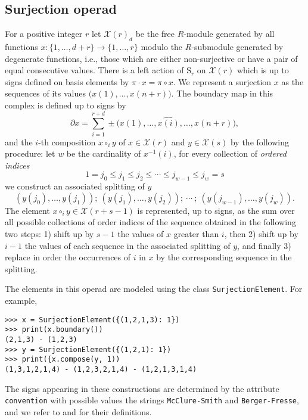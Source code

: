 \documentclass{amsart}
\newcommand{\X}{\mathcal X}
\begin{document}
\subsection{Surjection operad}

For a positive integer $r$ let $\mathcal X(r)_d$ be the free $R$-module generated by all functions $x : \{1, \dots, d+r\} \to \{1, \dots, r\}$ modulo the $R$-submodule generated by degenerate functions, i.e., those which are either non-surjective or have a pair of equal consecutive values. There is a left action of $\mathrm S_r$ on $\mathcal X(r)$ which is up to signs defined on basis elements by $\pi \cdot x = \pi \circ x$.
We represent a surjection $x$ as the sequences of its values $\big( x(1), \dots, x(n+r) \big)$. The boundary map in this complex is defined up to signs by
\begin{equation*}
\partial x = \sum_{i = 1}^{r+d} \pm \big( x(1), \dots, \widehat{x(i)}, \dots, x(n+r) \big),
\end{equation*}
and the $i$-th composition $x \circ_i y$ of $x \in \mathcal X(r)$ and $y \in \mathcal X(s)$ by the following procedure: let $w$ be the cardinality of $x^{-1}(i)$, for every collection of \textit{ordered indices}
\begin{equation*}
1 = j_0 \leq j_1 \leq j_2 \leq \cdots \leq j_{w-1} \leq j_w = s
\end{equation*}
we construct an associated splitting of $y$
\begin{equation*}
(y(j_0), \dots, y(j_1));\ (y(j_1), \dots, y(j_2));\ \cdots \ ;\ (y(j_{w-1}), \dots, y(j_w)).
\end{equation*}
The element $x \circ_i y \in \X(r+s-1)$ is represented, up to signs, as the sum over all possible collections of order indices of the sequence obtained in the following two steps: 1) shift up by $s-1$ the values of $x$ greater than $i$, then 2) shift up by $i-1$ the values of each sequence in the associated splitting of $y$, and finally 3) replace in order the occurrences of $i$ in $x$ by the corresponding sequence in the splitting.

The elements in this operad are modeled using the class \texttt{SurjectionElement}. For example,
\begin{verbatim}
>>> x = SurjectionElement({(1,2,1,3): 1})
>>> print(x.boundary())
(2,1,3) - (1,2,3)
>>> y = SurjectionElement({(1,2,1): 1})
>>> print({x.compose(y, 1))
(1,3,1,2,1,4) - (1,2,3,2,1,4) - (1,2,1,3,1,4)
\end{verbatim}

The signs appearing in these constructions are determined by the attribute \texttt{convention} with possible values the strings \texttt{McClure-Smith} and \texttt{Berger-Fresse}, and we refer to \cite{McClureSmith03} and \cite{BergerFresse04} for their definitions.
\end{document}
